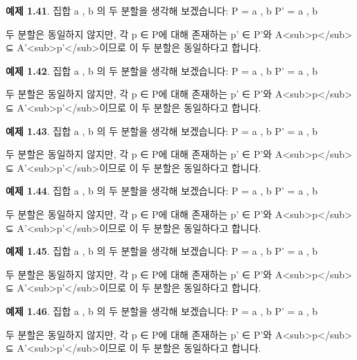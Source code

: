 \documentclass[11pt, a4paper, twoside, openany]{book}
\begin{document}
\par\medskip
\textbf{예제 1.41}. 집합 { a , b }의 두 분할을 생각해 보겠습니다:
P = { { a } , { b } }
P' = { { a , b } }

\par\medskip
두 분할은 동일하지 않지만, 각 p ∈ P\hspace{0pt}에 대해 존재하는 p' ∈ P'와 A<sub>p</sub> ⊆ A'<sub>p'</sub>이므로 이 두 분할은 동일하다고 합니다.

\par\medskip
\textbf{예제 1.42}. 집합 { a , b }의 두 분할을 생각해 보겠습니다:
P = { { a } , { b } }
P' = { { a , b } }

\par\medskip
두 분할은 동일하지 않지만, 각 p ∈ P\hspace{0pt}에 대해 존재하는 p' ∈ P'와 A<sub>p</sub> ⊆ A'<sub>p'</sub>이므로 이 두 분할은 동일하다고 합니다.

\par\medskip
\textbf{예제 1.43}. 집합 { a , b }의 두 분할을 생각해 보겠습니다:
P = { { a } , { b } }
P' = { { a , b } }

\par\medskip
두 분할은 동일하지 않지만, 각 p ∈ P\hspace{0pt}에 대해 존재하는 p' ∈ P'와 A<sub>p</sub> ⊆ A'<sub>p'</sub>이므로 이 두 분할은 동일하다고 합니다.

\par\medskip
\textbf{예제 1.44}. 집합 { a , b }의 두 분할을 생각해 보겠습니다:
P = { { a } , { b } }
P' = { { a , b } }

\par\medskip
두 분할은 동일하지 않지만, 각 p ∈ P\hspace{0pt}에 대해 존재하는 p' ∈ P'와 A<sub>p</sub> ⊆ A'<sub>p'</sub>이므로 이 두 분할은 동일하다고 합니다.

\par\medskip
\textbf{예제 1.45}. 집합 { a , b }의 두 분할을 생각해 보겠습니다:
P = { { a } , { b } }
P' = { { a , b } }

\par\medskip
두 분할은 동일하지 않지만, 각 p ∈ P\hspace{0pt}에 대해 존재하는 p' ∈ P'와 A<sub>p</sub> ⊆ A'<sub>p'</sub>이므로 이 두 분할은 동일하다고 합니다.

\par\medskip
\textbf{예제 1.46}. 집합 { a , b }의 두 분할을 생각해 보겠습니다:
P = { { a } , { b } }
P' = { { a , b } }

\par\medskip
두 분할은 동일하지 않지만, 각 p ∈ P\hspace{0pt}에 대해 존재하는 p' ∈ P'와 A<sub>p</sub> ⊆ A'<sub>p'</sub>이므로 이 두 분할은 동일하다고 합니다.
\end{document}
